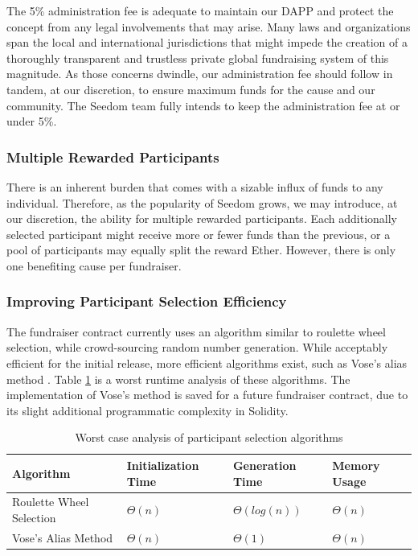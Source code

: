 \documentclass[11pt]{article}
\begin{document}
The 5\% administration fee is adequate to maintain our DAPP and protect the concept from any legal involvements that may arise. Many laws and organizations span the local and international jurisdictions that might impede the creation of a thoroughly transparent and trustless private global fundraising system of this magnitude. As those concerns dwindle, our administration fee should follow in tandem, at our discretion, to ensure maximum funds for the cause and our community. The Seedom team fully intends to keep the administration fee at or under 5\%.

\subsubsection{Multiple Rewarded Participants}

There is an inherent burden that comes with a sizable influx of funds to any individual. Therefore, as the popularity of Seedom grows, we may introduce, at our discretion, the ability for multiple rewarded participants. Each additionally selected participant might receive more or fewer funds than the previous, or a pool of participants may equally split the reward Ether. However, there is only one benefiting cause per fundraiser.

\subsubsection{Improving Participant Selection Efficiency}
\label{sec:improvingParticipantSelectionEfficiency}

The fundraiser contract currently uses an algorithm similar to roulette wheel selection, while crowd-sourcing random number generation. While acceptably efficient for the initial release, more efficient algorithms exist, such as Vose's alias method \cite{8}. Table \ref{tab:worstCaseAnalysisOfParticipantSelectionAlgorithms} is a worst runtime analysis of these algorithms. The implementation of Vose's method is saved for a future fundraiser contract, due to its slight additional programmatic complexity in Solidity.

\begin{table}[H]
\begin{center}
\begin{tabular}{| l | l | l | l |}
\hline
\textbf{Algorithm} & \textbf{Initialization Time} & \textbf{Generation Time} & \textbf{Memory Usage} \\ \hline
Roulette Wheel Selection & $\Theta(n)$ & $\Theta(log(n))$ & $\Theta(n)$ \\ \hline
Vose's Alias Method & $\Theta(n)$ & $\Theta(1)$ & $\Theta(n)$ \\ \hline
\end{tabular}
\caption{Worst case analysis of participant selection algorithms}
\label{tab:worstCaseAnalysisOfParticipantSelectionAlgorithms}
\end{center}
\end{table}
\end{document}
